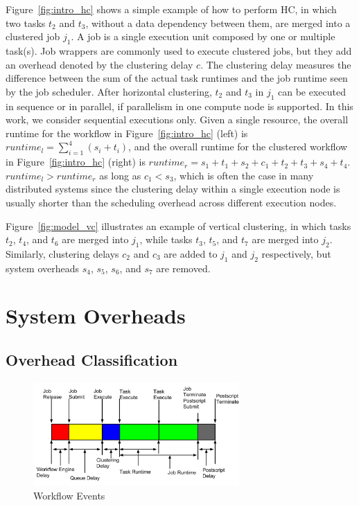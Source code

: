 Figure~\ref{fig:intro_hc} shows a simple example of how to perform HC, in which two tasks $t_2$ and $t_3$, without a data dependency between them, are merged into a clustered job $j_1$. A job is a single execution unit composed by one or multiple task(s). Job wrappers are commonly used to execute clustered jobs, but they add an overhead denoted by the clustering delay $c$. The clustering delay measures the difference between the sum of the actual task runtimes and the job runtime seen by the job scheduler. 
After horizontal clustering, $t_2$ and $t_3$ in $j_1$ can be executed in sequence or in parallel, if parallelism in one compute node is supported. In this work, we consider sequential executions only. Given a single resource, the overall runtime for the workflow in Figure~\ref{fig:intro_hc} (left) is $runtime_l= \sum_{i=1}^{4}(s_i+t_i)$, and the overall runtime for the clustered workflow in Figure~\ref{fig:intro_hc} (right) is $runtime_r=s_1+t_1+s_2+c_1+t_2+t_3+s_4+t_4$.  $runtime_l > runtime_r$ as long as $c_1 < s_3$, which is often the case in many distributed systems since the clustering delay within a single execution node is usually shorter than the scheduling overhead across different execution nodes. 


Figure~\ref{fig:model_vc} illustrates an example of vertical clustering, in which tasks $t_2$, $t_4$, and $t_6$ are merged into $j_1$, while tasks $t_3$, $t_5$, and $t_7$ are merged into $j_2$. Similarly, clustering delays $c_2$ and $c_3$ are added to $j_1$ and $j_2$ respectively, but system overheads $s_4$, $s_5$, $s_6$, and $s_7$ are removed. 



\section{System Overheads}
\label{sec:overheads}
\subsection{Overhead Classification}


\begin{figure}[h!]
	\centering
    \includegraphics[width=0.7\textwidth]{figures/model/Job_Timeline.pdf}
    \caption{Workflow Events}
    \label{fig:model_overhead}
\end{figure}


